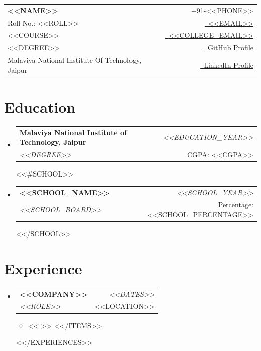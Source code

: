 \documentclass[a4paper,11pt]{article}
\makeatletter
\newcommand{\resumeSubheading}[4]{
\vspace{0.5mm}\item
    \begin{tabular*}{0.98\textwidth}[t]{l@{\extracolsep{\fill}}r}
        \textbf{#1} & \textit{\footnotesize{#4}} \\
        \textit{\footnotesize{#3}} &  \footnotesize{#2}\\
    \end{tabular*}
    \vspace{-2.4mm}
}
\newcommand{\resumeSubHeadingListStart}{\begin{itemize}[leftmargin=*,labelsep=0mm]}
\newcommand{\resumeItemListStart}{\begin{justify}\begin{itemize}[leftmargin=3ex, rightmargin=2ex, noitemsep,labelsep=1.2mm,itemsep=0mm]\small}
\newcommand{\resumeSubHeadingListEnd}{\end{itemize}\vspace{2mm}}
\newcommand{\resumeItemListEnd}{\end{itemize}\end{justify}\vspace{-2mm}}
\newcommand{\name}{<<NAME>>} %
\newcommand{\course}{<<COURSE>>} %
\newcommand{\roll}{<<ROLL>>} %
\newcommand{\phone}{<<PHONE>>} %
\newcommand{\emaila}{<<EMAIL>>} %
\newcommand{\emailb}{<<COLLEGE_EMAIL>>} %
\makeatother
\begin{document}
\selectfont


\parbox{\linewidth}{
\begin{tabularx}{\linewidth}{L r} \\
  \textbf{\Large \name} & {\raisebox{0.0\height}{\footnotesize \faPhone}\ +91-\phone}\\
  {Roll No.: \roll} & \href{mailto:\emaila}{\raisebox{0.0\height}{\footnotesize \faEnvelope}\ {\emaila}} \\
  \course &  \href{mailto:\emailb}{\raisebox{0.0\height}{\footnotesize \faEnvelope}\ {\emailb}}\\
  {<<DEGREE>>} &  \href{<<GITHUB_URL>>}{\raisebox{0.0\height}{\footnotesize \faGithub}\ {GitHub Profile}} \\
  {Malaviya National Institute Of Technology, Jaipur} & \href{<<LINKEDIN_URL>>}{\raisebox{0.0\height}{\footnotesize \faLinkedin}\ {LinkedIn Profile}}
\end{tabularx}
}




\section{\textbf{Education}}
  \resumeSubHeadingListStart
    \resumeSubheading
      {Malaviya National Institute of Technology, Jaipur}{CGPA: <<CGPA>>}
      {<<DEGREE>>}{<<EDUCATION_YEAR>>}
    <<#SCHOOL>>
    \resumeSubheading
      {<<SCHOOL_NAME>>}{Percentage: <<SCHOOL_PERCENTAGE>>}
      {<<SCHOOL_BOARD>>}{<<SCHOOL_YEAR>>}
    <</SCHOOL>>
  \resumeSubHeadingListEnd
\vspace{-5.5mm}



\section{\textbf{Experience}}
  \resumeSubHeadingListStart
    <<#EXPERIENCES>>
    \resumeSubheading
      {<<COMPANY>>}{<<LOCATION>>}
      {<<ROLE>>}{<<DATES>>}
      \vspace{-2.0mm}
      \resumeItemListStart
    <<#ITEMS>>
    \item <<.>>
    <</ITEMS>>
    \resumeItemListEnd
    \vspace{-3.0mm}
    <</EXPERIENCES>>
  \resumeSubHeadingListEnd
\vspace{-8.5mm}
\end{document}
